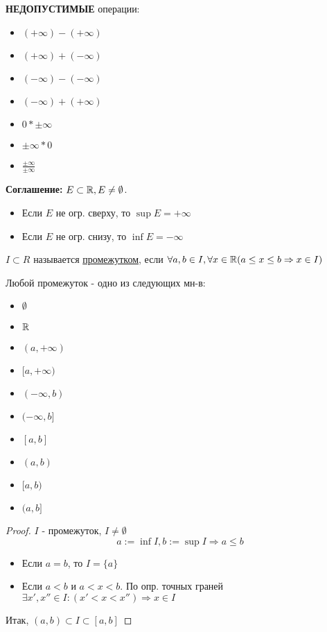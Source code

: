 \textbf{НЕДОПУСТИМЫЕ} операции:
\begin{itemize}
    \item $(+\infty) - (+\infty)$
    \item $(+\infty) + (-\infty)$
    \item $(-\infty) - (-\infty)$
    \item $(-\infty) + (+\infty)$
    \item $0 * \pm \infty$
    \item $\pm \infty * 0$
    \item $\frac{\pm \infty}{\pm \infty}$
\end{itemize}
\textbf{Соглашение: } $E \subset \mathbb{R}, E \neq \emptyset$.
\begin{itemize}
    \item Если $E$ не огр. сверху, то $\sup E = +\infty$
    \item Если $E$ не огр. снизу, то $\inf E = -\infty$
\end{itemize}
\begin{definition}
$I \subset R$ называется \underline{промежутком}, если $\forall a, b \in I, \forall x \in \mathbb{R} (a \leq x \leq b \Rightarrow x \in I)$
\end{definition}
\begin{lemma}
    Любой промежуток - одно из следующих мн-в:
    \begin{itemize}
        \item $\emptyset$
        \item $\mathbb{R}$
        \item $(a, +\infty)$
        \item $[a, +\infty)$
        \item $(-\infty, b)$
        \item $(-\infty, b]$
        \item $[a, b]$
        \item $(a, b)$
        \item $[a, b)$
        \item $(a, b]$
    \end{itemize}
\end{lemma}
\begin{proof}
$I$ - промежуток, $I \neq \emptyset$
\[
a := \inf I, b := \sup I \Rightarrow a \leq b
\] 
\begin{itemize}
    \item Если $a = b$, то $I = \{a\}$
    \item Если $a < b$ и $a < x < b$. По опр. точных граней $\exists x', x'' \in I \colon  (x' < x < x'') \Rightarrow x \in I$
\end{itemize}
Итак, $(a, b) \subset I \subset [a, b]$

\end{proof}
